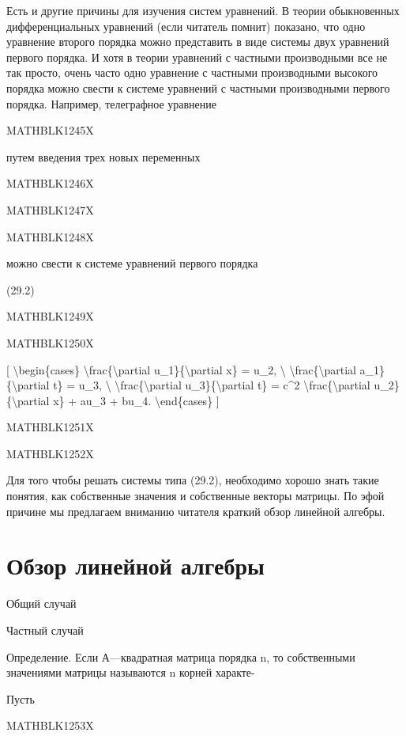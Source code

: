 \documentclass[
]{article}
\begin{document}
Есть и другие причины для изучения систем уравнений. В теории
обыкновенных дифференциальных уравнений (если читатель помнит) показано,
что одно уравнение второго порядка можно представить в виде системы двух
уравнений первого порядка. И хотя в теории уравнений с частными
производными все не так просто, очень часто одно уравнение с частными
производными высокого порядка можно свести к системе уравнений с
частными производными первого порядка. Например, телеграфное уравнение

MATHBLK1245X

путем введения трех новых переменных

MATHBLK1246X

MATHBLK1247X

MATHBLK1248X

можно свести к системе уравнений первого порядка

(29.2)

MATHBLK1249X

MATHBLK1250X

{[} \textbackslash begin\{cases\}
\textbackslash frac\{\textbackslash partial
u\_1\}\{\textbackslash partial x\} = u\_2, \textbackslash{}
\textbackslash frac\{\textbackslash partial
a\_1\}\{\textbackslash partial t\} = u\_3, \textbackslash{}
\textbackslash frac\{\textbackslash partial
u\_3\}\{\textbackslash partial t\} = c\^{}2
\textbackslash frac\{\textbackslash partial
u\_2\}\{\textbackslash partial x\} + au\_3 + bu\_4.
\textbackslash end\{cases\} {]}

MATHBLK1251X

MATHBLK1252X

Для того чтобы решать системы типа (29.2), необходимо хорошо знать такие
понятия, как собственные значения и собственные векторы матрицы. По эфой
причине мы предлагаем вниманию читателя краткий обзор линейной алгебры.

\section{Обзор линейной
алгебры}\label{ux43eux431ux437ux43eux440-ux43bux438ux43dux435ux439ux43dux43eux439-ux430ux43bux433ux435ux431ux440ux44b}

Общий случай

Частный случай

Определение. Если А---квадратная матрица порядка n, то собственными
значениями матрицы называются n корней характе-

Пусть

MATHBLK1253X
\end{document}

